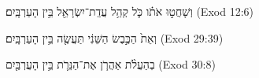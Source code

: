 
\begin{exe}

\ex\label{simbetween_exs1}
\texthebrew{
וְשָׁחֲט֣וּ אֹתֹ֗ו כֹּ֛ל קְהַ֥ל עֲדַֽת־יִשְׂרָאֵ֖ל בֵּ֥ין הָעַרְבָּֽיִם׃ 
} (Exod 12:6)

\ex\label{simbetween_exs2}
\texthebrew{
וְאֵת֙ הַכֶּ֣בֶשׂ הַשֵּׁנִ֔י תַּעֲשֶׂ֖ה בֵּ֥ין הָעַרְבָּֽיִם׃ 
} (Exod 29:39)

\ex\label{simbetween_exs3}
\texthebrew{
בְהַעֲלֹ֨ת אַהֲרֹ֧ן אֶת־הַנֵּרֹ֛ת בֵּ֥ין הָעֲרְבַּ֖יִם 
} (Exod 30:8)

\end{exe}
